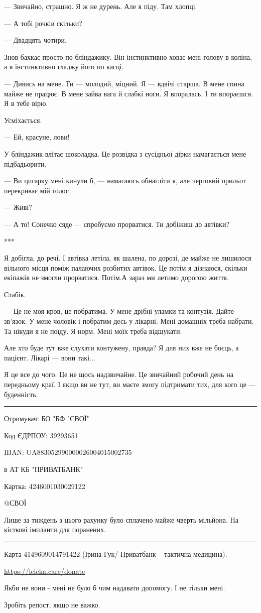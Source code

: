 — Звичайно, страшно. Я ж не дурень. Але я піду. Там хлопці. 

— А тобі рочків скільки?

— Двадцять чотири. 

Знов бахкає просто по бліндажику. Він інстинктивно ховає мені голову в коліна,
а я інстинктивно гладжу його по касці. 

— Дивись на мене. Ти — молодий, міцний. Я — вдвічі старша. В мене спина майже
не працює. В мене зайва вага й слабкі ноги. Я впоралась. І ти впораєшся. Я в
тебе вірю. 

Усміхається. 

 — Ей, красуне, лови! 

У бліндажик влітає шоколадка. Це розвідка з сусідньої дірки намагається мене
підбадьорити. 

— Ви цигарку мені кинули б, — намагаюсь обнагліти я, але черговий прильот
перекриває  мій голос. 

— Живі?

— А то! Сонечко сяде — спробуємо прорватися. Ти добіжиш до автівки? 

***

Я добігла, до речі.  І автівка летіла, як шалена, по дорозі, де майже не
лишилося вільного місця поміж палаючих розбитих автівок. Це потім я дізнаюся,
скільки екіпажів не змогли прорватися. Потім.А зараз ми летимо дорогою життя. 

Стабік. 

— Це не моя кров, це побратима. У мене дрібні уламки та контузія. Дайте
зв'язок. У мене чоловік і побратим  десь у лікарні. Мені домашніх треба
набрати. Та нікуди я не поїду. Я норм. Мені моїх треба відшукати. 

Але хто буде тут вже слухати контужену, правда? Я для них   вже не боєць, а
пацієнт. Лікарі — вони такі... 

Я це все до чого. Це не щось надзвичайне. Це звичайний робочий день на
передньому краї. І якщо ви не тут, ви маєте змогу підтримати тих, для кого це —
буденність.

\par\noindent\rule{\textwidth}{0.4pt}

Отримувач: БО "БФ "СВОЇ"\par
Код ЄДРПОУ: 39293651\par
IBAN: UA883052990000026004015002735\par
в АТ КБ "ПРИВАТБАНК"\par
Картка: 4246001030029122\par
@СВОЇ\par

Лише за тиждень з цього рахунку було сплачено майже чверть мільйона. На
кісткові імпланти для поранених. 

\par\noindent\rule{\textwidth}{0.4pt}

Карта 4149609014791422 (Ірина Гук/ Приватбанк – тактична медицина).

\url{https://leleka.care/donate}

Якби не вони - мені не було б чим надавати допомогу. І не тільки мені.

Зробіть репост, якщо не важко.
